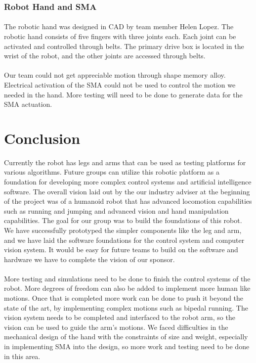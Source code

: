 \documentclass[titlepage,letterpaper,12pt]{article}
\begin{document}
\subsubsection{Robot Hand and SMA}
\paragraph{}The robotic hand was designed in CAD by team member Helen Lopez. The
robotic hand consists of five fingers with three joints each. Each joint can be
activated and controlled through belts. The primary drive box is located in the
wrist of the robot, and the other joints are accessed through belts. 

\paragraph{}Our team could not get appreciable motion through shape memory
alloy. Electrical activation of the SMA could not be used to control the motion
we needed in the hand. More testing will need to be done to generate data for
the SMA actuation.

\section{Conclusion}
\paragraph{}Currently the robot has legs and arms that can be used as testing
platforms for various algorithms. Future groups can utilize this robotic
platform as a foundation for developing more complex control systems and
artificial intelligence software. The overall vision laid out by the our
industry adviser at the beginning of the project was of a humanoid robot that
has advanced locomotion capabilities such as running and jumping and advanced
vision and hand manipulation capabilities. The goal for our group was to build
the foundations of this robot. We have successfully prototyped the simpler
components like the leg and arm, and we have laid the software foundations for
the control system and computer vision system. It would be easy for future teams
to build on the software and hardware we have to complete the vision of our
sponsor.

\paragraph{}More testing and simulations need to be done to finish the control
systems of the robot. More degrees of freedom can also be added to implement
more human like motions. Once that is completed more work can be done to push it
beyond the state of the art, by implementing complex motions such as bipedal
running. The vision system needs to be completed and interfaced to the robot
arm, so the vision can be used to guide the arm's motions. We faced difficulties
in the mechanical design of the hand with the constraints of size and weight,
especially in implementing SMA into the design, so more work and testing need to
be done in this area.
\end{document}
